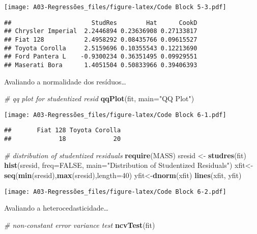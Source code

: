 \documentclass[]{article}
\newenvironment{Shaded}{\begin{snugshade}}{\end{snugshade}}
\newcommand{\CommentTok}[1]{\textcolor[rgb]{0.56,0.35,0.01}{\textit{#1}}}
\newcommand{\DataTypeTok}[1]{\textcolor[rgb]{0.13,0.29,0.53}{#1}}
\newcommand{\DecValTok}[1]{\textcolor[rgb]{0.00,0.00,0.81}{#1}}
\newcommand{\KeywordTok}[1]{\textcolor[rgb]{0.13,0.29,0.53}{\textbf{#1}}}
\newcommand{\NormalTok}[1]{#1}
\newcommand{\OtherTok}[1]{\textcolor[rgb]{0.56,0.35,0.01}{#1}}
\newcommand{\StringTok}[1]{\textcolor[rgb]{0.31,0.60,0.02}{#1}}
\begin{document}
\texttt{[image: A03-Regressões\_files/figure-latex/Code Block 5-3.pdf]}

\begin{verbatim}
##                      StudRes        Hat      CookD
## Chrysler Imperial  2.2446894 0.23636908 0.27133817
## Fiat 128           2.4958292 0.08435766 0.09615527
## Toyota Corolla     2.5159696 0.10355543 0.12213690
## Ford Pantera L    -0.9300234 0.36351495 0.09929551
## Maserati Bora      1.4051504 0.50833966 0.39406393
\end{verbatim}

Avaliando a normalidade dos resíduos\ldots{}

\begin{Shaded}
\begin{Highlighting}[]
\CommentTok{# qq plot for studentized resid}
\KeywordTok{qqPlot}\NormalTok{(fit, }\DataTypeTok{main=}\StringTok{"QQ Plot"}\NormalTok{)}
\end{Highlighting}
\end{Shaded}

\texttt{[image: A03-Regressões\_files/figure-latex/Code Block 6-1.pdf]}

\begin{verbatim}
##       Fiat 128 Toyota Corolla 
##             18             20
\end{verbatim}

\begin{Shaded}
\begin{Highlighting}[]
\CommentTok{# distribution of studentized residuals}
\KeywordTok{require}\NormalTok{(MASS)}
\NormalTok{sresid <-}\StringTok{ }\KeywordTok{studres}\NormalTok{(fit) }
\KeywordTok{hist}\NormalTok{(sresid, }\DataTypeTok{freq=}\OtherTok{FALSE}\NormalTok{, }
   \DataTypeTok{main=}\StringTok{"Distribution of Studentized Residuals"}\NormalTok{)}
\NormalTok{xfit<-}\KeywordTok{seq}\NormalTok{(}\KeywordTok{min}\NormalTok{(sresid),}\KeywordTok{max}\NormalTok{(sresid),}\DataTypeTok{length=}\DecValTok{40}\NormalTok{) }
\NormalTok{yfit<-}\KeywordTok{dnorm}\NormalTok{(xfit) }
\KeywordTok{lines}\NormalTok{(xfit, yfit)}
\end{Highlighting}
\end{Shaded}

\texttt{[image: A03-Regressões\_files/figure-latex/Code Block 6-2.pdf]}

Avaliando a heterocedasticidade\ldots{}

\begin{Shaded}
\begin{Highlighting}[]
\CommentTok{# non-constant error variance test}
\KeywordTok{ncvTest}\NormalTok{(fit)}
\end{Highlighting}
\end{Shaded}
\end{document}
